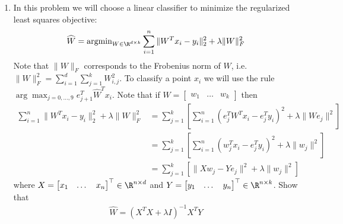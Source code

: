 \documentclass{article}
\begin{document}
\begin{aprob}
    \begin{enumerate}
        \item {} In this problem we will choose a linear classifier to minimize the regularized least squares objective:
        \begin{align*}
            \widehat{W} = \text{argmin}_{W \in \R^{d \times k}} \sum_{i=1}^{n} \| W^Tx_{i} - y_{i} \|^{2}_{2} + \lambda \|W\|_{F}^{2}
        \end{align*}
        Note that $\|W\|_{F}$ corresponds to the Frobenius norm of $W$, i.e. $\|W\|_{F}^{2} = \sum_{i=1}^d \sum_{j=1}^k W_{i,j}^2$. To classify a point $x_i$ we will use the rule $\arg\max_{j=0,\dots,9} e_{j+1}^T \widehat{W}^T x_i$. Note that if $W = \begin{bmatrix} w_1 & \dots & w_k \end{bmatrix}$ then
        \begin{align*}
            \sum_{i=1}^{n} \| W^Tx_{i} - y_{i} \|^{2}_{2} + \lambda \|W\|_{F}^{2} &= \sum_{j=1}^k \left[  \sum_{i=1}^n ( e_j^T W^T x_i - e_j^T y_i)^2 + \lambda \| W e_j \|^2 \right] \\
            &= \sum_{j=1}^k \left[  \sum_{i=1}^n ( w_j^T x_i - e_j^T y_i)^2 + \lambda \| w_j \|^2 \right] \\
            &= \sum_{j=1}^k \left[  \| X w_j - Y e_j\|^2 + \lambda \| w_j \|^2 \right]
        \end{align*}
        where $X = \begin{bmatrix} x_1 & \dots & x_n \end{bmatrix}^\top \in \R^{n \times d}$ and $Y = \begin{bmatrix} y_1 & \dots & y_n \end{bmatrix}^\top \in \R^{n \times k}$. Show that
        \begin{align*}
            \widehat{W} = (X^T X + \lambda I)^{-1} X^T Y
        \end{align*} 


\end{enumerate}
\end{aprob}
\end{document}
